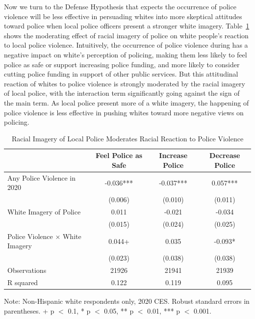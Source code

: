 \documentclass[
  12pt,
]{article}
\begin{document}
Now we turn to the Defense Hypothesis that expects the occurrence of
police violence will be less effective in persuading whites into more
skeptical attitudes toward police when local police officers present a
stronger white imagery. Table~\ref{tbl-reaction} shows the moderating
effect of racial imagery of police on white people's reaction to local
police violence. Intuitively, the occurrence of police violence during
has a negative impact on white's perception of policing, making them
less likely to feel police as safe or support increasing police funding,
and more likely to consider cutting police funding in support of other
public services. But this attitudinal reaction of whites to police
violence is strongly moderated by the racial imagery of local police,
with the interaction term significantly going against the sign of the
main term. As local police present more of a white imagery, the
happening of police violence is less effective in pushing whites toward
more negative views on policing.

\hypertarget{tbl-reaction}{}
\begin{table}
\caption{\label{tbl-reaction}Racial Imagery of Local Police Moderates Racial Reaction to Police
Violence }\tabularnewline

\centering
\begin{threeparttable}
\begin{tabular}[t]{lccc}
\toprule
  & Feel Police as Safe & Increase Police & Decrease Police\\
\midrule
Any Police Violence in 2020 & -0.036*** & -0.037*** & 0.057***\\
 & (0.006) & (0.010) & (0.011)\\
White Imagery of Police & 0.011 & -0.021 & -0.034\\
 & (0.015) & (0.024) & (0.025)\\
Police Violence × White Imagery & 0.044+ & 0.035 & -0.093*\\
 & (0.023) & (0.038) & (0.038)\\
\midrule
Observations & 21926 & 21941 & 21939\\
R squared & 0.122 & 0.119 & 0.095\\
\bottomrule
\end{tabular}
\begin{tablenotes}
\item Note: Non-Hispanic white respondents only, 2020 CES. Robust standard errors in parentheses. + p $<$ 0.1, * p $<$ 0.05, ** p $<$ 0.01, *** p $<$ 0.001.
\end{tablenotes}
\end{threeparttable}
\end{table}
\end{document}
